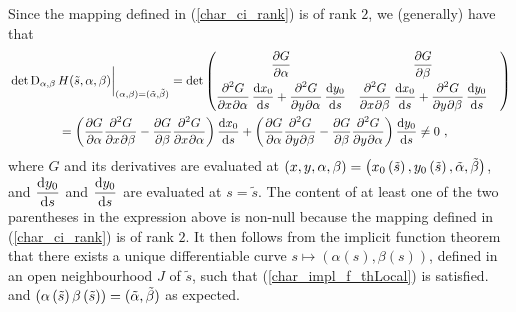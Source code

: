 \begin{rmk}
Since the mapping defined in (\ref{char_ci_rank}) is of rank $2$, we
(generally) have that
\begin{align*}
&\det \diff_{\alpha,\beta} H(\tilde{s},\alpha,\beta)
\bigg|_{(\alpha,\beta) = (\tilde{\alpha},\tilde{\beta})}
= \det \begin{pmatrix}
\DS \pdydx{G}{\alpha} & \DS \pdydx{G}{\beta} \\[0.7em]
\DS \pdydxnm{G}{x}{\alpha}{2}{}{}\, \dydx{x_0}{s}
+ \pdydxnm{G}{y}{\alpha}{2}{}{}\, \dydx{y_0}{s} &
\DS \pdydxnm{G}{x}{\beta}{2}{}{}\, \dydx{x_0}{s}
+ \pdydxnm{G}{y}{\beta}{2}{}{}\, \dydx{y_0}{s} &
\end{pmatrix} \\
&\qquad \qquad = \left( \pdydx{G}{\alpha} \pdydxnm{G}{x}{\beta}{2}{}{}
- \pdydx{G}{\beta} \pdydxnm{G}{x}{\alpha}{2}{}{} \right)
\dydx{x_0}{s} + \left(\pdydx{G}{\alpha} \pdydxnm{G}{y}{\beta}{2}{}{}
- \pdydx{G}{\beta} \pdydxnm{G}{y}{\alpha}{2}{}{} \right)
\dydx{y_0}{s} \neq 0 \ ,
\end{align*}
where $G$ and its derivatives are evaluated at
$\DS (x,y,\alpha,\beta)
= \left(x_0\left(\tilde{s}\right), y_0\left(\tilde{s}\right),
\tilde{\alpha}, \tilde{\beta} \right)$,
and $\DS \dydx{y_0}{s}$ and $\DS \dydx{y_0}{s}$
are evaluated at $s = \tilde{s}$.  The content of at
least one of the two parentheses in the expression above is non-null
because the mapping defined in (\ref{char_ci_rank}) is of rank $2$.
It then follows from the implicit function theorem that there exists a
unique differentiable curve $s\mapsto (\alpha(s),\beta(s))$, defined
in an open neighbourhood $J$ of $\tilde{s}$, such that
(\ref{char_impl_f_thLocal}) is satisfied.
and $\DS \left(\alpha\left(\tilde{s}\right)
\beta\left(\tilde{s}\right)\right)
= (\tilde{\alpha},\tilde{\beta})$ as expected.
\end{rmk}

